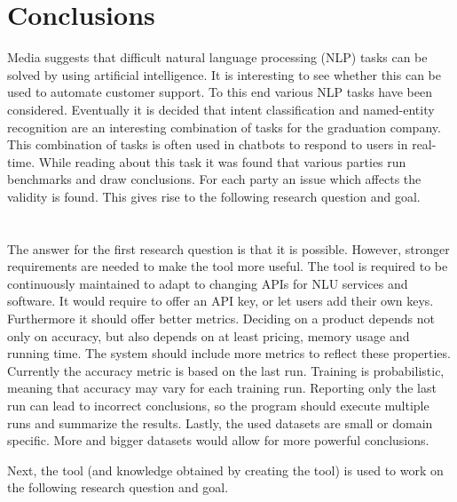 \chapter{Conclusions}
\label{ch:conclusions}
Media suggests that difficult natural language processing (NLP) tasks can be solved by using artificial intelligence.
It is interesting to see whether this can be used to automate customer support.
To this end various NLP tasks have been considered.
Eventually it is decided that intent classification and named-entity recognition are an interesting combination of tasks for the graduation company.
This combination of tasks is often used in chatbots to respond to users in real-time.
While reading about this task it was found that various parties run benchmarks and draw conclusions.
For each party an issue which affects the validity is found.
This gives rise to the following research question and goal.\\

\rqone\\

\rgone\\

The answer for the first research question is that it is possible.
However, stronger requirements are needed to make the tool more useful.
The tool is required to be continuously maintained to adapt to changing APIs for NLU services and software.
It would require to offer an API key, or let users add their own keys.
Furthermore it should offer better metrics.
Deciding on a product depends not only on accuracy, but also depends on at least pricing, memory usage and running time.
The system should include more metrics to reflect these properties.
Currently the accuracy metric is based on the last run.
Training is probabilistic, meaning that accuracy may vary for each training run.
Reporting only the last run can lead to incorrect conclusions, so the program should execute multiple runs and summarize the results.
Lastly, the used datasets are small or domain specific.
More and bigger datasets would allow for more powerful conclusions.

Next, the tool (and knowledge obtained by creating the tool) is used to work on the following research question and goal.\\

\rqtwo\\

\rgtwo\\

